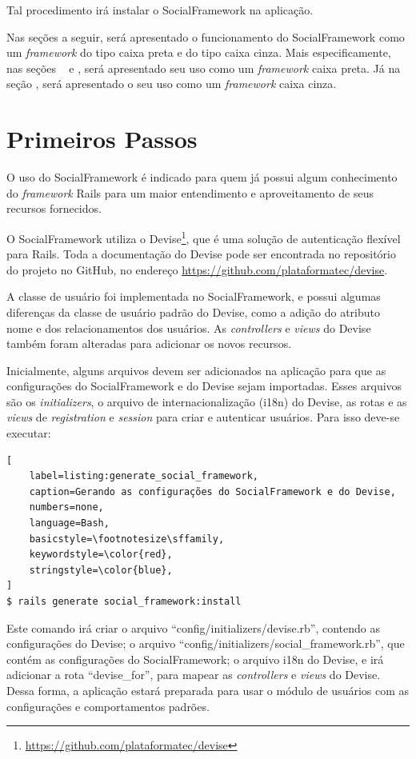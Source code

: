 Tal procedimento irá instalar o SocialFramework na aplicação.

Nas seções a seguir, será apresentado o funcionamento do SocialFramework como um \textit{framework} do tipo caixa preta e do tipo caixa cinza. Mais especificamente, nas seções ~ e , será apresentado seu uso como um \textit{framework} caixa preta. Já na seção , será apresentado o seu uso como um \textit{framework} caixa cinza.

\section{Primeiros Passos}
\label{sec:primeiros_passos}

O uso do SocialFramework é indicado para quem já possui algum conhecimento do \textit{framework} Rails para um maior entendimento e aproveitamento de seus recursos fornecidos.

O SocialFramework utiliza o Devise\footnote{\url{https://github.com/plataformatec/devise}}, que é uma solução de autenticação flexível para Rails. Toda a documentação do Devise pode ser encontrada no repositório do projeto no GitHub, no endereço \url{https://github.com/plataformatec/devise}.

A classe de usuário foi implementada no SocialFramework, e possui algumas diferenças da classe de usuário padrão do Devise, como a adição do atributo nome e dos relacionamentos dos usuários. As \textit{controllers} e \textit{views} do Devise também foram alteradas para adicionar os novos recursos.

Inicialmente, alguns arquivos devem ser adicionados na aplicação para que as configurações do SocialFramework e do Devise sejam importadas. Esses arquivos são os \textit{initializers}, o arquivo de internacionalização (i18n) do Devise, as rotas e as \textit{views} de \textit{registration} e \textit{session} para criar e autenticar usuários. Para isso deve-se executar:

\begin{lstlisting}[
    label=listing:generate_social_framework,
    caption=Gerando as configurações do SocialFramework e do Devise,
    numbers=none,
    language=Bash,
    basicstyle=\footnotesize\sffamily,
    keywordstyle=\color{red},
    stringstyle=\color{blue},
]
$ rails generate social_framework:install
\end{lstlisting}

Este comando irá criar o arquivo ``config/initializers/devise.rb'', contendo as configurações do Devise; o arquivo ``config/initializers/social\_framework.rb'', que contém as configurações do SocialFramework; o arquivo i18n do Devise, e irá adicionar a rota ``devise\_for'', para mapear as \textit{controllers} e \textit{views} do Devise. Dessa forma, a aplicação estará preparada para usar o módulo de usuários com as configurações e comportamentos padrões.

